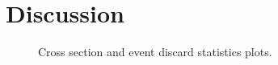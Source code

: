 \section{Discussion}%
\label{sec:disco}
\begin{figure}[ht]
  \centering
  \begin{subfigure}[t]{.49\textwidth}
    \caption{\label{fig:disc-xs}}
  \end{subfigure}
  \begin{subfigure}[t]{.49\textwidth}
    \caption{\label{fig:disc-iso-disc}}
  \end{subfigure}
  \begin{subfigure}[t]{.49\textwidth}
    \caption{\label{fig:disc-cut-disc}}
  \end{subfigure}
  \caption{Cross section and event discard statistics plots.}
\end{figure}

